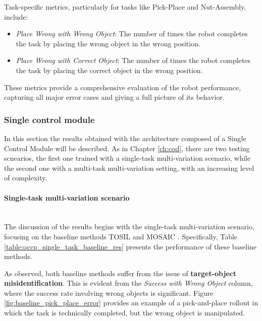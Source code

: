 Task-specific metrics, particularly for tasks like Pick-Place and Nut-Assembly, include:

\begin{itemize}
    \item \textit{Place Wrong with Wrong Object}: The number of times the robot completes the task by placing the wrong object in the wrong position.
    \item \textit{Place Wrong with Correct Object}: The number of times the robot completes the task by placing the correct object in the wrong position.
\end{itemize}

These metrics provide a comprehensive evaluation of the robot performance, capturing all major error cases and giving a full picture of its behavior.

\subsubsection{Single control module}
In this section the results obtained with the architecture composed of a Single Control Module will be described. As in Chapter \ref{ch:cod}, there are two testing scnearios, the first one trained with a single-task  multi-variation scenario, while the second one with a multi-task multi-variation setting, with an increasing level of complexity.
\label{sec:ocpl_results_scm}
\paragraph*{Single-task multi-variation scenario}\mbox{}\\

The discussion of the results begins with the single-task multi-variation scenario, focusing on the baseline methods TOSIL \cite{dasari2021transformers_one_shot} and MOSAIC \cite{mandi2022towards_more_generalizable_one_shot}. Specifically, Table \ref{table:occp_single_task_baseline_res} presents the performance of these baseline methods. 


As observed, both baseline methods suffer from the issue of \textbf{target-object misidentification}. This is evident from the \textit{Success with Wrong Object} column, where the success rate involving wrong objects is significant. Figure \ref{fig:baseline_pick_place_error} provides an example of a pick-and-place rollout in which the task is technically completed, but the wrong object is manipulated.


